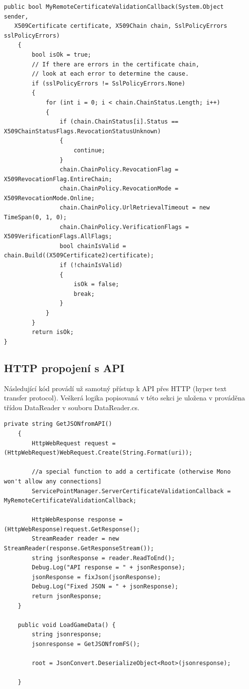 \documentclass[thesis=B,czech]{FITthesis}[2012/06/26]
\begin{document}
	\begin{lstlisting}[frame=single]
public bool MyRemoteCertificateValidationCallback(System.Object sender,
   X509Certificate certificate, X509Chain chain, SslPolicyErrors sslPolicyErrors)
    {
        bool isOk = true;
        // If there are errors in the certificate chain,
        // look at each error to determine the cause.
        if (sslPolicyErrors != SslPolicyErrors.None)
        {
            for (int i = 0; i < chain.ChainStatus.Length; i++)
            {
                if (chain.ChainStatus[i].Status == X509ChainStatusFlags.RevocationStatusUnknown)
                {
                    continue;
                }
                chain.ChainPolicy.RevocationFlag = X509RevocationFlag.EntireChain;
                chain.ChainPolicy.RevocationMode = X509RevocationMode.Online;
                chain.ChainPolicy.UrlRetrievalTimeout = new TimeSpan(0, 1, 0);
                chain.ChainPolicy.VerificationFlags = X509VerificationFlags.AllFlags;
                bool chainIsValid = chain.Build((X509Certificate2)certificate);
                if (!chainIsValid)
                {
                    isOk = false;
                    break;
                }
            }
        }
        return isOk;
}
	\end{lstlisting}
	
	\subsection{HTTP propojení s API}
	Následující kód provádí už samotný přístup k API přes HTTP (hyper text transfer protocol). Veškerá logika popisovaná v této sekci je uložena v prováděna třídou DataReader v souboru DataReader.cs.
	
	\begin{lstlisting}[frame=single]
	 private string GetJSONfromAPI()
    {
        HttpWebRequest request = (HttpWebRequest)WebRequest.Create(String.Format(uri));

        //a special function to add a certificate (otherwise Mono won't allow any connections]
        ServicePointManager.ServerCertificateValidationCallback = MyRemoteCertificateValidationCallback;

        HttpWebResponse response = (HttpWebResponse)request.GetResponse();
        StreamReader reader = new StreamReader(response.GetResponseStream());
        string jsonResponse = reader.ReadToEnd();
        Debug.Log("API response = " + jsonResponse);
        jsonResponse = fixJson(jsonResponse);
        Debug.Log("Fixed JSON = " + jsonResponse);
        return jsonResponse;
    }

    public void LoadGameData() {
        string jsonresponse;
        jsonresponse = GetJSONfromFS();

        root = JsonConvert.DeserializeObject<Root>(jsonresponse);       

    }
	\end{lstlisting}
	
\end{document}
